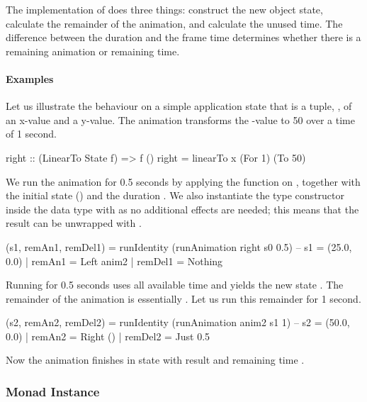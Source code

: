 The  implementation of  does three things: construct
the new object state, calculate the remainder of the animation, and calculate
the unused time. The difference between the  duration and the
frame time determines whether there is a remaining  animation or
remaining time.

\paragraph{Examples}

Let us illustrate the behaviour on a simple application
state that is a tuple, , of an {x}-value and a {y}-value.
The  animation transforms the -value to 50 over a time of 1
second.

\begin{code}
right :: (LinearTo State f) => f ()
right = linearTo x (For 1) (To 50)
\end{code}

We run the animation for 0.5 seconds by applying the  function
on , together with the initial state () and the duration . We also instantiate the  type constructor  inside
the  data type with  as no additional effects are
needed; this means that the result can be unwrapped with
.

\begin{code}
(s1, remAn1, remDel1) = runIdentity (runAnimation right s0 0.5)
-- s1 = (25.0, 0.0) | remAn1 = Left anim2 | remDel1 = Nothing
\end{code}

Running  for 0.5 seconds uses all available time and yields the new state
. The remainder of
the animation is essentially . Let us run this
remainder for 1 second.

\begin{code}
(s2, remAn2, remDel2) = runIdentity (runAnimation anim2 s1 1)
-- s2 = (50.0, 0.0) | remAn2 = Right () | remDel2 = Just 0.5
\end{code}

Now the animation finishes in state  with result \hs{()} and remaining time .

\subsubsection{Monad Instance}

